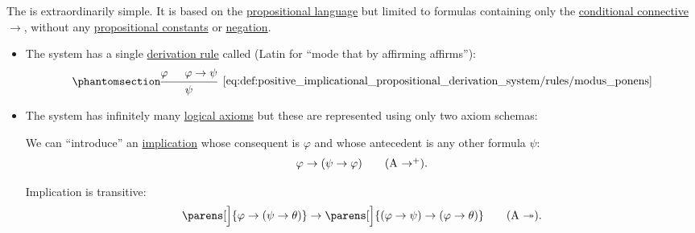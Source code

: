\begin{definition}\label{def:positive_implicational_propositional_derivation_system}
  The  is extraordinarily simple. It is based on the \hyperref[def:propositional_language]{propositional language} but limited to formulas containing only the \hyperref[def:propositional_language/connectives/conditional]{conditional connective} \( \rightarrow \), without any \hyperref[def:propositional_language/constants]{propositional constants} or \hyperref[def:propositional_language/negation]{negation}.

  \begin{itemize}
    \item The system has a single \hyperref[def:proof_derivation_system/rules]{derivation rule} called  (Latin for \enquote{mode that by affirming affirms}):
    \begin{equation*}\taglabel[\textrm{MP}]{eq:def:positive_implicational_propositional_derivation_system/rules/modus_ponens}
      \begin{prooftree}
        \hypo{ \varphi}
        \hypo{ \varphi \rightarrow \psi }
        \infer2[\ref{eq:def:positive_implicational_propositional_derivation_system/rules/modus_ponens}]{ \psi }
      \end{prooftree}
    \end{equation*}

    \item The system has infinitely many \hyperref[def:proof_derivation_system/axioms]{logical axioms} but these are represented using only two axiom schemas:
    \begin{thmenum}
       We can \enquote{introduce} an \hyperref[def:material_implication]{implication} whose consequent is \( \varphi \) and whose antecedent is any other formula \( \psi \):
      \begin{equation}\label{eq:def:positive_implicational_propositional_derivation_system/axioms/imp/intro}
        \varphi \rightarrow (\psi \rightarrow \varphi) \tag{\textrm{A} \( \rightarrow^+ \)}.
      \end{equation}

       Implication is transitive:
      \begin{equation}\label{eq:def:positive_implicational_propositional_derivation_system/axioms/imp/trans}
        \parens[\Big]{ \varphi \rightarrow (\psi \rightarrow \theta) } \rightarrow \parens[\Big]{ (\varphi \rightarrow \psi) \rightarrow (\varphi \rightarrow \theta)} \tag{\textrm{A} \( \twoheadrightarrow \)}.
      \end{equation}
    \end{thmenum}
  \end{itemize}


\end{definition}
